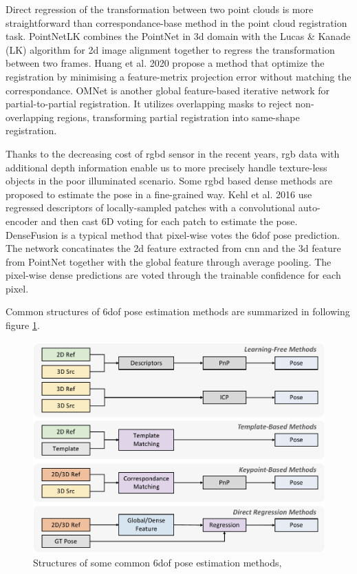 \documentclass[12pt,DIV14,BCOR12mm,a4paper,footinclude=false,headinclude,parskip=half-,twoside,openright,cleardoublepage=empty,toc=index,bibliography=totoc,listof=totoc]{scrreprt}
\numberwithin{equation}{chapter}
\begin{document}
Direct regression of the transformation between two point clouds is more straightforward than correspondance-base method in the point cloud registration task. PointNetLK \cite{aoki2019pointnetlk} combines the PointNet in \gls{3d} domain with the Lucas \& Kanade (LK) algorithm \cite{Lucas1981AnII} for \gls{2d} image alignment together to regress the transformation between two frames. Huang et al. 2020 \cite{huang2020featuremetric} propose a method that optimize the registration by minimising a feature-metrix projection error without matching the correspondance. OMNet \cite{xu2021omnet} is another global feature-based iterative network for partial-to-partial registration. It utilizes overlapping masks to reject non-overlapping regions, transforming partial registration into same-shape registration.

Thanks to the decreasing cost of \gls{rgbd} sensor in the recent years, \gls{rgb} data with additional depth information enable us to more precisely handle texture-less objects in the poor illuminated scenario. Some \gls{rgbd} based dense methods are proposed to estimate the pose in a fine-grained way. Kehl et al. 2016 \cite{kehl2016deep} use regressed descriptors of locally-sampled patches with a convolutional auto-encoder and then cast 6D voting for each patch to estimate the pose. DenseFusion \cite{wang2019densefusion} is a typical method that pixel-wise votes the \gls{6dof} pose prediction. The network concatinates the \gls{2d} feature extracted from \gls{cnn} and the \gls{3d} feature from PointNet together with the global feature through average pooling. The pixel-wise dense predictions are voted through the trainable confidence for each pixel. 

Common structures of \gls{6dof} pose estimation methods are summarized in following figure \ref{img:pose_methods}.
\begin{figure}[h]
	\centering
	\includegraphics[width=1.\textwidth]{img/pose_methods.pdf}
	\caption{Structures of some common \gls{6dof} pose estimation methods,}
	\label{img:pose_methods}
\end{figure}
\end{document}
